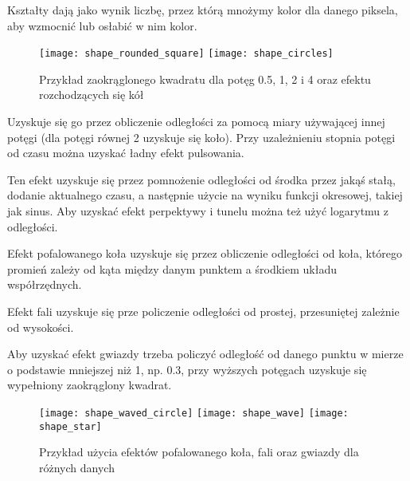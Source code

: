 
Kształty dają jako wynik liczbę, przez którą mnożymy kolor dla danego piksela, aby wzmocnić lub osłabić w nim kolor.\bigskip

\begin{wrapfigure}{l}{0.55\textwidth}
	\centering
	\noindent\texttt{[image: shape\_rounded\_square]}
	\noindent\texttt{[image: shape\_circles]}
	\caption{Przykład zaokrąglonego kwadratu dla potęg 0.5, 1, 2 i 4 oraz efektu rozchodzących się kół}
\end{wrapfigure}


Uzyskuje się go przez obliczenie odległo\'sci za pomocą miary używającej innej potęgi (dla potęgi równej 2 uzyskuje się koło). Przy uzależnieniu stopnia potęgi od czasu można uzyskać ładny efekt pulsowania.\smallskip


Ten efekt uzyskuje się przez pomnożenie odległo\'sci od \'srodka przez jaką\'s stałą, dodanie aktualnego czasu, a następnie użycie na wyniku funkcji okresowej, takiej jak sinus. Aby uzyskać efekt perpektywy i tunelu można też użyć logarytmu z odległo\'sci.\smallskip


Efekt pofalowanego koła uzyskuje się przez obliczenie odległo\'sci od koła, którego promień zależy od kąta między danym punktem a \'srodkiem układu współrzędnych.\smallskip


Efekt fali uzyskuje się prze policzenie odległo\'sci od prostej, przesuniętej zależnie od wysoko\'sci.\smallskip


Aby uzyskać efekt gwiazdy trzeba policzyć odległo\'sć od danego punktu w mierze o podstawie mniejszej niż 1, np. 0.3, przy wyższych potęgach uzyskuje się wypełniony zaokrąglony kwadrat.

\begin{figure}[h]
	\centering
	\noindent\texttt{[image: shape\_waved\_circle]}
	\noindent\texttt{[image: shape\_wave]}
	\noindent\texttt{[image: shape\_star]}
	\caption{Przykład użycia efektów pofalowanego koła, fali oraz gwiazdy dla różnych danych}
\end{figure}\newpage

